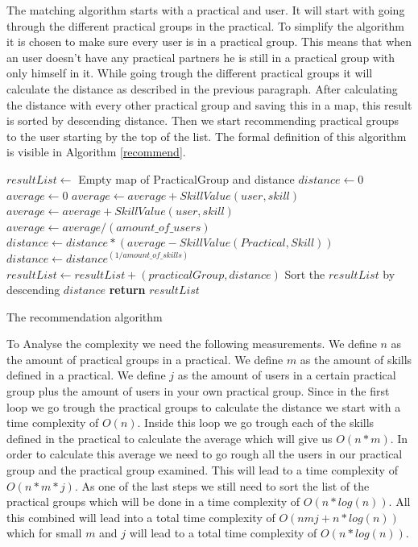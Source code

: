 The matching algorithm starts with a practical and user.
It will start with going through the different practical groups in the practical.
To simplify the algorithm it is chosen to make sure every user is in a practical group.
This means that when an user doesn't have any practical partners he is still in a practical group with only himself in it.
While going trough the different practical groups it will calculate the distance as described in the previous paragraph.
After calculating the distance with every other practical group and saving this in a map, this result is sorted by descending distance.
Then we start recommending practical groups to the user starting by the top of the list.
The formal definition of this algorithm is visible in Algorithm \ref{recommend}.

\begin{algorithm}
\begin{algorithmic}
	\State $resultList\gets$ Empty map of PracticalGroup and distance
		\State $distance\gets 0$
			\State $average\gets 0$
				\State $average\gets average + SkillValue(user, skill)$
			\EndFor
				\State $average\gets average + SkillValue(user, skill)$
			\EndFor
			\State $average\gets average / (amount\_of\_users)$
			\State $distance\gets distance * (average - SkillValue(Practical, Skill))$
		\EndFor
		\State $distance\gets distance ^ {(1 / amount\_of\_skills)}$
		\State $resultList\gets resultList + (practicalGroup, distance)$
	\EndFor
	\State Sort the $resultList$ by descending $distance$
	\State \textbf{return} $resultList$
\EndFunction
\caption{The recommendation algorithm}\label{recommend}
\end{algorithmic}
\end{algorithm}

To Analyse the complexity we need the following measurements.
We define $n$ as the amount of practical groups in a practical.
We define $m$ as the amount of skills defined in a practical.
We define $j$ as the amount of users in a certain practical group plus the amount of users in your own practical group.
Since in the first loop we go trough the practical groups to calculate the distance we start with a time complexity of $O(n)$.
Inside this loop we go trough each of the skills defined in the practical to calculate the average which will give us $O(n*m)$.
In order to calculate this average we need to go rough all the users in our practical group and the practical group examined.
This will lead to a time complexity of $O(n*m*j)$.
As one of the last steps we still need to sort the list of the practical groups which will be done in a time complexity of $O(n*log(n))$.
All this combined will lead into a total time complexity of $O(nmj+n*log(n))$ which for small $m$ and $j$ will lead to a total time complexity of $O(n*log(n))$.

